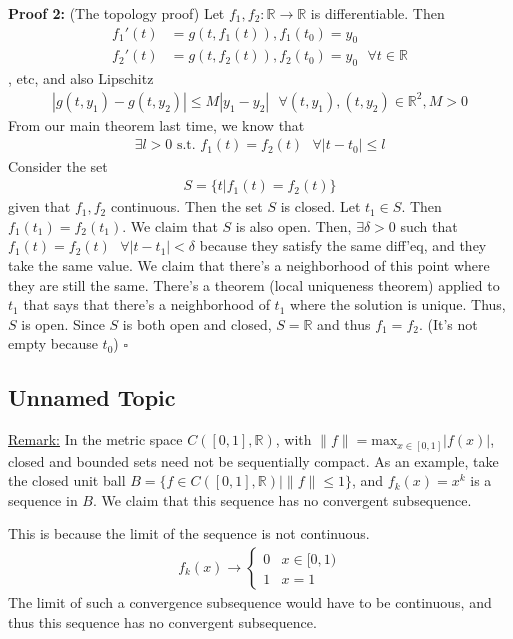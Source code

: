 \documentclass{article}
\newcommand*{\qed}{\hfill$\square$}%
\newcommand*{\txt}[1]{\text{ #1 }}%
\newcommand*{\fora}{\txt{}\forall}%
\newcommand*{\rr}{\mathbb{R}}%
\begin{document}
\textbf{Proof 2:} (The topology proof) Let $f_1,f_2:\rr\to\rr$ is differentiable. Then \begin{align*}
    f_1'(t)&=g(t,f_1(t)),f_1(t_0)=y_0\\
    f_2'(t)&=g(t,f_2(t)),f_2(t_0)=y_0 \fora t\in \rr
\end{align*}, etc, and also Lipschitz \begin{align*}
    |g(t,y_1)-g(t,y_2)|\leq M|y_1-y_2|\fora (t,y_1),(t,y_2)\in \rr^2,M>0
\end{align*} From our main theorem last time, we know that \begin{align*}
    \exists l>0\txt{s.t.}f_1(t)=f_2(t)\fora |t-t_0|\leq l
\end{align*} Consider the set \begin{align*}
    S=\{t|f_1(t)=f_2(t)\}
\end{align*} given that $f_1,f_2$ continuous. Then the set $S$ is closed. Let $t_1\in S$. Then $f_1(t_1)=f_2(t_1)$. We claim that $S$ is also open. Then, $\exists \delta>0$ such that $f_1(t)=f_2(t)\fora |t-t_1|<\delta$ because they satisfy the same diff'eq, and they take the same value. We claim that there's a neighborhood of this point where they are still the same. There's a theorem (local uniqueness theorem) applied to $t_1$ that says that there's a neighborhood of $t_1$ where the solution is unique. Thus, $S$ is open. Since $S$ is both open and closed, $S=\rr$ and thus $f_1=f_2$. (It's not empty because $t_0$) \qed

\subsection{Unnamed Topic} 

\underline{Remark:} In the metric space $C([0,1],\rr)$, with $\|f\|=\text{max}_{x\in[0,1]}|f(x)|$, closed and bounded sets need not be sequentially compact. As an example, take the closed unit ball $B=\{f\in C([0,1],\rr)|\|f\|\leq 1\}$, and $f_k(x)=x^k$ is a sequence in $B$. We claim that this sequence has no convergent subsequence.

This is because the limit of the sequence is not continuous. \begin{align*}
    f_k(x)\to \begin{cases}
        0 & x\in[0,1)\\
        1 & x=1
    \end{cases}
\end{align*} The limit of such a convergence subsequence would have to be continuous, and thus this sequence has no convergent subsequence.
\end{document}
